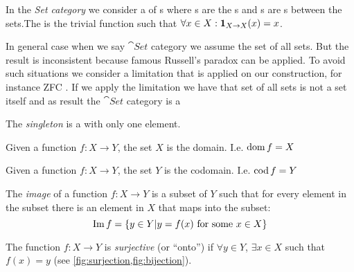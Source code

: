 \begin{definition}
  \label{def:setcategory}
  In the \textit{Set category} we consider a
   of 
  s where 
  s are the s and
  s are s between the
  sets.The  is the trivial function such that $\forall x \in
  X: \mathbf{1}_{ X \to X }(x) = x$.
\end{definition}

\begin{remark}
  In general case when we say $\cat{Set}$ category we assume the set
  of all sets. But the result is inconsistent because famous Russell's
  paradox \cite{wiki:russell_paradox} can be applied. To avoid such
  situations we consider a limitation that is applied on our
  construction, for instance 
  ZFC \cite{wiki:zfc}. If we apply the limitation we have that set of
  all sets is not a set itself and as result the  $\cat{Set}$
  category is a 
\end{remark}

\begin{definition}[Singleton]
\label{def:singleton_set} 
The \textit{singleton} is a  with only one element.
\end{definition}

\begin{example}[Domain]
  \label{ex:domain_set}
  Given a function $f: X \to Y$, the set $X$ is the domain. I.e. $\operatorname{dom}
  f = X$
\end{example}

\begin{example}[Codomain]
  \label{ex:codomain_set}
  Given a function $f: X \to Y$, the set $Y$ is the codomain. I.e.
  $\operatorname{cod} f = Y$
\end{example}

\begin{definition}[Image]
\label{def:function_image} 
The \textit{image} of a function $f: X \to Y$ is a subset of
 $Y$ such that for every element in the subset
there is an element in  $X$ that maps into the
subset:
\[
\operatorname{Im}{f} = \{y \in Y| y = f(x) \mbox{ for some } x \in X\}
\]
\end{definition}


\begin{definition}[Surjection]
  \label{def:surjection}
  The function $f: X \rightarrow Y$ is \textit{surjective} (or ``onto'') if
  $\forall y \in Y$, $\exists x \in X$ such that
  $f\left(x\right) = y$ (see \cref{fig:surjection,fig:bijection}).
\end{definition}

